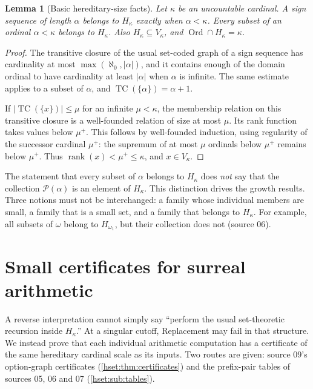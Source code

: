\documentclass[11pt,letterpaper]{article}
\newtheorem{lemma}[lemma]{Lemma}\aliascntresetthe{lemma}
\theoremstyle{definition}
\theoremstyle{remark}
\newcommand{\Ord}{\operatorname{Ord}}
\newcommand{\TC}{\operatorname{TC}}
\newcommand{\Pow}{\mathcal P}
\newcommand{\card}[1]{\lvert#1\rvert}
\newcommand{\rank}{\operatorname{rank}}
\begin{document}
\begin{lemma}[Basic hereditary-size facts]
\label{hset:lem:hereditary}
Let $\kappa$ be an uncountable cardinal.
A sign sequence of length $\alpha$ belongs to $H_\kappa$ exactly when
$\alpha<\kappa$. Every subset of an ordinal $\alpha<\kappa$ belongs to
$H_\kappa$. Also $H_\kappa\subseteq V_\kappa$, and $\Ord\cap H_\kappa=\kappa$.
\end{lemma}
\begin{proof}
The transitive closure of the usual set-coded graph of a sign sequence has
cardinality at most $\max(\aleph_0,\card\alpha)$, and it contains enough of
the domain ordinal to have cardinality at least $\card\alpha$ when $\alpha$
is infinite. The same estimate applies to a subset of $\alpha$, and
$\TC(\{\alpha\})=\alpha+1$.

If $\card{\TC(\{x\})}\le\mu$ for an infinite $\mu<\kappa$, the membership
relation on this transitive closure is a well-founded relation of size at
most $\mu$. Its rank function takes values below $\mu^+$. This follows by
well-founded induction, using regularity of the successor cardinal $\mu^+$:
the supremum of at most $\mu$ ordinals below $\mu^+$ remains below $\mu^+$.
Thus $\rank(x)<\mu^+\le\kappa$, and $x\in V_\kappa$.
\end{proof}

The statement that every subset of $\alpha$ belongs to $H_\kappa$ does
\emph{not} say that the collection $\Pow(\alpha)$ is an element of
$H_\kappa$. This distinction drives the growth results. Three notions must
not be interchanged: a family whose individual members are small, a family
that is a small set, and a family that belongs to $H_\kappa$. For example,
all subsets of $\omega$ belong to $H_{\omega_1}$, but their collection does not
(source 06).

\section{Small certificates for surreal arithmetic}
\label{hset:sec:certificates}

A reverse interpretation cannot simply say ``perform the usual set-theoretic
recursion inside $H_\kappa$.'' At a singular cutoff, Replacement may fail in
that structure. We instead prove that each individual arithmetic computation
has a certificate of the same hereditary cardinal scale as its inputs. Two
routes are given: source 09's option-graph certificates
(\cref{hset:thm:certificates}) and the prefix-pair tables of sources 05, 06
and 07 (\cref{hset:sub:tables}).
\end{document}
